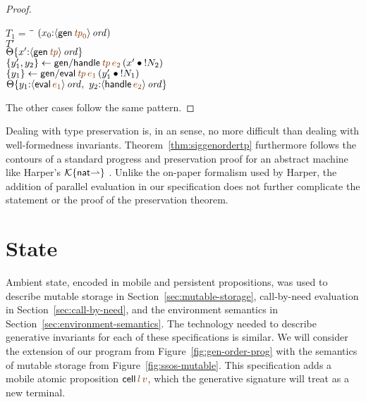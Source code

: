 \begin{proof}
\begin{description}
\begin{tabbing}
$T_1 = ~$ \= \qquad \= $(x_0{:}\istrue{\susp{{\sf gen}\,\lf{{\it tp}_0}}})$
\\
\>$T'$
\\
\>\>$\tackon{\Theta}{x'{:}\istrue{\susp{{\sf gen}\,\lf{{\it tp}}}}}$
\\
\>$\trstep{y_1',y_2}{{\sf gen/handle}\,\lf{\it tp}\,\lf{e_2}\,(\tfuser{x'}{\tbangr{N_2}})}$
\\
\>$\trstep{y_1}{{\sf gen/eval}\,\lf{\it tp}\,\lf{e_1}\,(\tfuser{y_1'}{\tbangr{N_1}})}$
\\
\>\>$\tackon{\Theta}{y_1{:}\istrue{\susp{{\sf eval}\,\lf{e_1}}}, ~
                   y_2{:}\istrue{\susp{{\sf handle}\,\lf{e_2}}}}$
\end{tabbing}


\end{description}

\noindent
The other cases follow the same pattern.
\end{proof}

Dealing with type preservation is, in an
sense, no more difficult than dealing with well-formedness
invariants. %
Theorem~\ref{thm:siggenordertp} furthermore follows the contours of a standard
progress and preservation proof for an abstract machine like Harper's
$\mathcal K\{{\sf nat}{\rightharpoonup}\}$ \cite[Chapter
27]{harper12practical}.  Unlike the on-paper formalism used by Harper,
the addition of parallel evaluation in our specification does not
further complicate the statement or the proof of the preservation theorem.


\section{State}
\label{sec:gen-state}

Ambient state, encoded in mobile and persistent propositions, was used
to describe mutable storage in Section~\ref{sec:mutable-storage},
call-by-need evaluation in Section~\ref{sec:call-by-need}, and the
environment semantics in Section~\ref{sec:environment-semantics}. The
technology needed to describe generative invariants for each of these
specifications is similar. We will consider the extension of our
program from Figure~\ref{fig:gen-order-prog} with the semantics of
mutable storage from Figure~\ref{fig:ssos-mutable}. This specification
adds a mobile atomic proposition ${\sf cell}\,\lf{l}\,\lf{v}$, which
the generative signature will treat as a new terminal.

